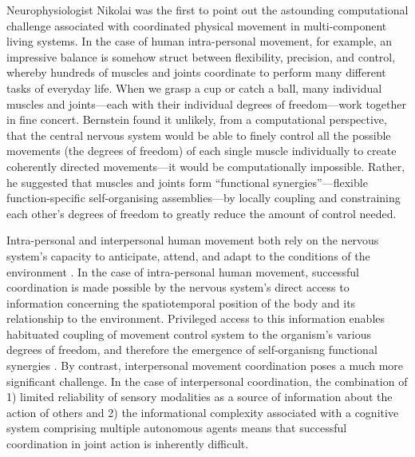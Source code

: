 \begin{CJK}{UTF8}{gbsn}
Neurophysiologist Nikolai \textcite{Bernstein1967} was the first to point out the astounding computational challenge associated with coordinated physical movement in multi-component living systems.  In the case of human intra-personal movement, for example, an impressive balance is somehow struct between flexibility, precision, and control, whereby hundreds of muscles and joints coordinate to perform many different tasks of everyday life.  When we grasp a cup or catch a ball, many individual muscles and joints---each with their individual degrees of freedom---work together in fine concert.  Bernstein found it unlikely, from a computational perspective, that the central nervous system would be able to finely control all the possible movements (the degrees of freedom) of each single muscle individually to create coherently directed movements---it would be computationally impossible.  Rather, he suggested that muscles and joints form  ``functional synergies''---flexible function-specific self-organising assemblies---by locally coupling and constraining each other’s degrees of freedom to greatly reduce the amount of control needed.

Intra-personal and interpersonal human movement both rely on the nervous system’s capacity to anticipate, attend, and adapt to the conditions of the environment \citep{Keller2014}.  In the case of intra-personal human movement, successful coordination is made possible by the nervous system's direct access to information concerning the spatiotemporal position of the body and its relationship to the environment.  Privileged access to this information enables habituated coupling of movement control system to the organism's various degrees of freedom, and therefore the emergence of self-organisng functional synergies \citep{Riley2011}.  By contrast, interpersonal movement coordination poses a much more significant challenge.  In the case of interpersonal coordination, the combination of 1) limited reliability of sensory modalities as a source of information about the action of others \citep{Wilson2005,Wolpert2003,Frith2007} and 2) the informational complexity associated with a cognitive system comprising multiple autonomous agents \citep[each with their own movement degrees of freedom; see][]{Turvey1978} means that successful coordination in joint action is inherently difficult.




\end{CJK}
